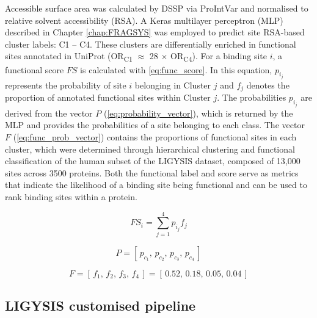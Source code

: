 Accessible surface area was calculated by DSSP \cite{KABSCH_1983_DSSP} via ProIntVar \cite{MACGOWAN_2020_DRSASP} and normalised \cite{TIEN_2013_RSA} to relative solvent accessibility (RSA). A Keras \cite{CHOLLET_2015_KERAS} multilayer perceptron (MLP) \cite{CYBENKO_1989_MLP} described in Chapter \ref{chap:FRAGSYS} \cite{UTGES_2024_FRAGSYS} was employed to predict site RSA-based cluster labels: C1 – C4. These clusters are differentially enriched in functional sites annotated in UniProt \cite{NIGHTINGALE_2017_API} (OR\textsubscript{C1} $\approx$ 28 $\times$ OR\textsubscript{C4}). For a binding site $i$, a functional score $FS$ is calculated with \autoref{eq:func_score}. In this equation, $p_{i_{j}}$ represents the probability of site $i$ belonging in Cluster $j$ and $f_j$ denotes the proportion of annotated functional sites within Cluster $j$. The probabilities $p_{i_{j}}$ are derived from the vector $P$ (\autoref{eq:probability_vector}), which is returned by the MLP and provides the probabilities of a site belonging to each class. The vector $F$ (\autoref{eq:func_prob_vector}) contains the proportions of functional sites in each cluster, which were determined through hierarchical clustering and functional classification of the human subset of the LIGYSIS dataset, composed of 13,000 sites across 3500 proteins. Both the functional label and score serve as metrics that indicate the likelihood of a binding site being functional and can be used to rank binding sites within a protein.

\begin{equation}
FS_i = \sum_{j=1}^{4} p_{i_{j}} f_j
\label{eq:func_score}
\end{equation}

\begin{equation}
P = [\,p_{c_1},\,p_{c_2},\,p_{c_3},\,p_{c_4}\,]
\label{eq:probability_vector}
\end{equation}

\begin{equation}
F = [\,f_{1},\,f_{2},\,f_{3},\,f_{4}\,] 
    = [\,0.52,\,0.18,\,0.05,\,0.04\,]
\label{eq:func_prob_vector}
\end{equation}

\subsection{LIGYSIS customised pipeline}


